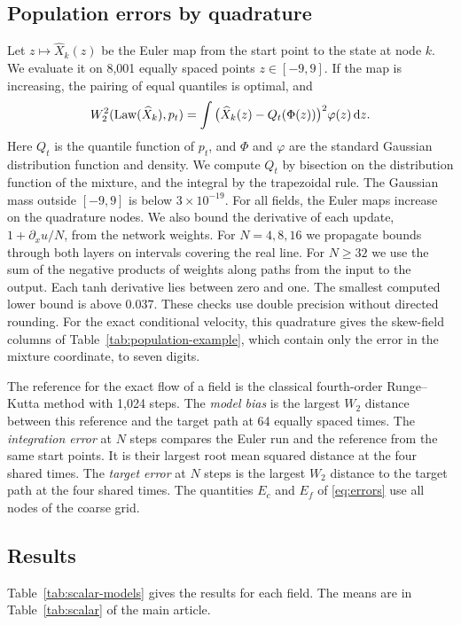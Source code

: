 \subsection{Population errors by quadrature}
Let $z\mapsto\widehat X_k(z)$ be the Euler map from the start point to
the state at node $k$. We evaluate it on 8,001 equally spaced points
$z\in[-9,9]$. If the map is increasing, the pairing of equal quantiles
is optimal, and
\[
 W_2^2(\operatorname{Law}(\widehat X_k),p_t)
 =\int\big(\widehat X_k(z)-Q_t(\Phi(z))\big)^2\varphi(z)\,\mathrm d z .
\]
Here $Q_t$ is the quantile function of $p_t$, and $\Phi$ and $\varphi$
are the standard Gaussian distribution function and density. We compute
$Q_t$ by bisection on the distribution function of the mixture, and the
integral by the trapezoidal rule. The Gaussian mass outside $[-9,9]$ is
below $3\times10^{-19}$. For all \ScalarModelCount{} fields, the Euler maps increase on the
quadrature nodes. We also bound the derivative of each update,
$1+\partial_xu/N$, from the network weights. For $N=4,8,16$ we
propagate bounds through both layers on intervals covering the real
line. For $N\ge32$ we use the sum of the negative products of weights
along paths from the input to the output. Each tanh derivative lies
between zero and one. The smallest computed lower bound is above
$0.037$. These checks use double precision without directed rounding. For the exact conditional
velocity, this quadrature gives the skew-field columns of
Table~\ref{tab:population-example}, which contain only the error in the mixture
coordinate, to seven digits.

The reference for the exact flow of a field is the classical
fourth-order Runge--Kutta method with 1,024 steps. The \emph{model bias}
is the largest $W_2$ distance between this reference and the target path
at 64 equally spaced times. The \emph{integration error} at $N$ steps compares the
Euler run and the reference from the same start points. It is their
largest root mean squared distance at the four shared times. The
\emph{target error} at $N$ steps is the largest $W_2$ distance to the
target path at the four shared times. The quantities $E_c$ and $E_f$ of
\eqref{eq:errors} use all nodes of the coarse grid.

\subsection{Results}
Table~\ref{tab:scalar-models} gives the results for each field. The
means are in Table~\ref{tab:scalar} of the main article.

